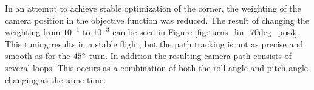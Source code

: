 In an attempt to achieve stable optimization of the corner, the weighting of the camera position in the objective function was reduced. The result of changing the weighting from $10^{-1}$ to $10^{-3}$ can be seen in Figure \ref{fig:turns_lin_70deg_pos3}. This tuning results in a stable flight, but the path tracking is not as precise and smooth as for the $45\degree$ turn. In addition the resulting camera path consists of several loops. This occurs as a combination of both the roll angle and pitch angle changing at the same time.

\begin{figure}
\end{figure}

